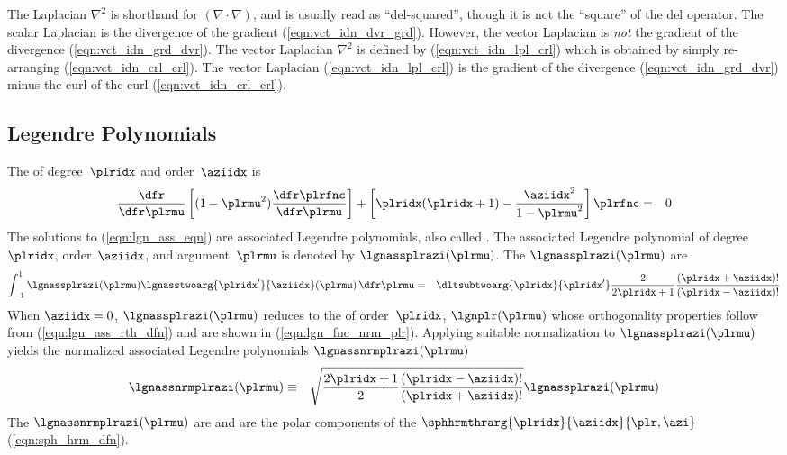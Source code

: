 \documentclass[12pt]{article}
\begin{document}
The Laplacian $\nabla^{2}$ is shorthand for $(\nabla \cdot \nabla)$, 
and is usually read as ``del-squared'', though it is not the
``square'' of the del operator.
The scalar Laplacian is the divergence of the gradient
(\ref{eqn:vct_idn_dvr_grd}).
However, the vector Laplacian is \textit{not} the gradient of the
divergence (\ref{eqn:vct_idn_grd_dvr}). 
The vector Laplacian $\nabla^{2}$ is defined by (\ref{eqn:vct_idn_lpl_crl}) 
which is obtained by simply re-arranging (\ref{eqn:vct_idn_crl_crl}). 
The vector Laplacian (\ref{eqn:vct_idn_lpl_crl}) is the gradient of
the divergence (\ref{eqn:vct_idn_grd_dvr}) minus the curl of the curl 
(\ref{eqn:vct_idn_crl_crl}).
\clearpage

\subsection{Legendre Polynomials}\label{sxn:lgn}
The  
of degree~$\plridx$ and order~$\aziidx$ is
\begin{eqnarray}
\frac{\dfr}{\dfr\plrmu}
\left[ (1 - \plrmu^{2}) \frac{\dfr\plrfnc}{\dfr\plrmu} \right] +
\left[ \plridx(\plridx+1) - \frac{\aziidx^{2}}{1-\plrmu^{2}} \right] \plrfnc
& = & 0
\label{eqn:lgn_ass_eqn}
\end{eqnarray}
The solutions to (\ref{eqn:lgn_ass_eqn}) are associated Legendre
polynomials, also called .
The associated Legendre polynomial of degree~$\plridx$,
order~$\aziidx$, and argument~$\plrmu$ is denoted by 
$\lgnassplrazi(\plrmu)$.
The $\lgnassplrazi(\plrmu)$ are 
\begin{eqnarray}
\int_{-1}^{1} \lgnassplrazi(\plrmu) 
\lgnasstwoarg{\plridx^{\prime}}{\aziidx}(\plrmu)
\,\dfr\plrmu
& = & 
\dltsubtwoarg{\plridx}{\plridx^{\prime}} 
\frac{2}{2\plridx+1} \frac{(\plridx+\aziidx)!}{(\plridx-\aziidx)!}
\label{eqn:lgn_ass_rth_dfn}
\end{eqnarray}
When $\aziidx = 0$, $\lgnassplrazi(\plrmu)$ reduces to the 
 of order~$\plridx$,
$\lgnplr(\plrmu)$ whose orthogonality properties follow from
(\ref{eqn:lgn_ass_rth_dfn}) and are shown in
(\ref{eqn:lgn_fnc_nrm_plr}). 
Applying suitable normalization to $\lgnassplrazi(\plrmu)$ yields
the normalized associated Legendre polynomials
$\lgnassnrmplrazi(\plrmu)$ 
\begin{eqnarray}
\lgnassnrmplrazi(\plrmu) & \equiv & 
\sqrt{\frac{2\plridx+1}{2}
\frac{(\plridx-\aziidx)!}{(\plridx+\aziidx)!}}
\lgnassplrazi(\plrmu)
\label{eqn:lgn_ass_nrm_dfn}
\end{eqnarray}
The $\lgnassnrmplrazi(\plrmu)$ are  and are the
polar components of the 
$\sphhrmthrarg{\plridx}{\aziidx}{\plr,\azi}$ (\ref{eqn:sph_hrm_dfn}).
\end{document}
